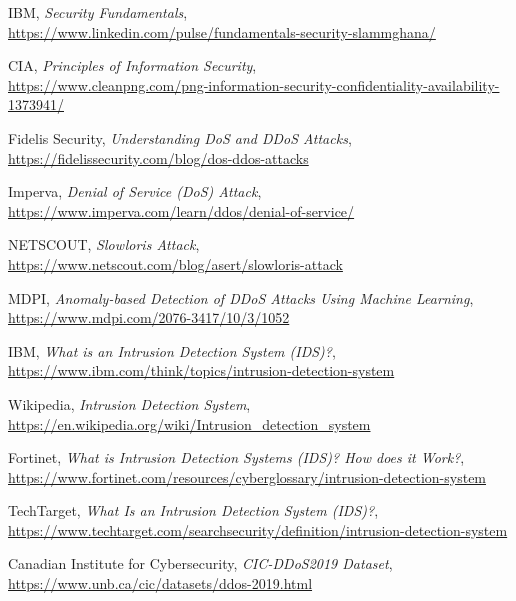 \documentclass[12pt]{report}
\begin{document}
\begin{thebibliography}{99}

IBM, \emph{Security Fundamentals},\\
\url{https://www.linkedin.com/pulse/fundamentals-security-slammghana/}

CIA, \emph{Principles of Information Security},\\
\url{https://www.cleanpng.com/png-information-security-confidentiality-availability-1373941/}

Fidelis Security, \emph{Understanding DoS and DDoS Attacks},\\
\url{https://fidelissecurity.com/blog/dos-ddos-attacks}

Imperva, \emph{Denial of Service (DoS) Attack},\\
\url{https://www.imperva.com/learn/ddos/denial-of-service/}

NETSCOUT, \emph{Slowloris Attack},\\
\url{https://www.netscout.com/blog/asert/slowloris-attack}

MDPI, \emph{Anomaly-based Detection of DDoS Attacks Using Machine Learning},\\
\url{https://www.mdpi.com/2076-3417/10/3/1052}

IBM, \emph{What is an Intrusion Detection System (IDS)?},\\
\url{https://www.ibm.com/think/topics/intrusion-detection-system}

Wikipedia, \emph{Intrusion Detection System},\\
\url{https://en.wikipedia.org/wiki/Intrusion_detection_system}

Fortinet, \emph{What is Intrusion Detection Systems (IDS)? How does it Work?},\\
\url{https://www.fortinet.com/resources/cyberglossary/intrusion-detection-system}

TechTarget, \emph{What Is an Intrusion Detection System (IDS)?},\\
\url{https://www.techtarget.com/searchsecurity/definition/intrusion-detection-system}

Canadian Institute for Cybersecurity, \emph{CIC-DDoS2019 Dataset},\\
\url{https://www.unb.ca/cic/datasets/ddos-2019.html}


\end{thebibliography}
\end{document}
